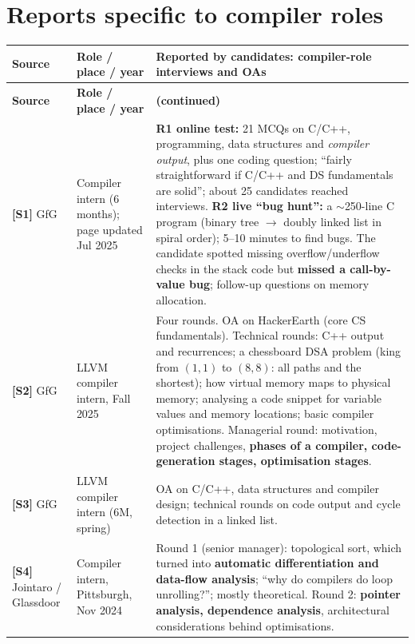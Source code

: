 \documentclass[10pt,a4paper,openany,oneside]{report}
\newcommand{\prio}[1]{\texorpdfstring{\ifcase#1\or{\color{gold}\ding{72}}\or{\color{gold}\ding{72}\ding{72}}\or{\color{gold}\ding{72}\ding{72}\ding{72}}\fi}{}}
\begin{document}
\section{Reports specific to compiler roles \prio{3}}
{\small\setlength{\tabcolsep}{3pt}
\begin{longtable}{@{}>{\raggedright\arraybackslash}p{2.1cm}>{\raggedright\arraybackslash}p{3.1cm}p{10.6cm}@{}}
\toprule
\rowcolor{orange!22}\textbf{Source} & \textbf{Role / place / year} & \textbf{Reported by candidates: compiler-role interviews and OAs}\\
\midrule
\endfirsthead
\toprule
\rowcolor{orange!22}\textbf{Source} & \textbf{Role / place / year} & \textbf{(continued)}\\
\midrule
\endhead
\textbf{[S1]} GfG & Compiler intern (6 months); page updated Jul 2025 &
 \textbf{R1 online test:} 21 MCQs on C/C++, programming, data structures and \emph{compiler output}, plus one coding question; ``fairly
 straightforward if C/C++ and DS fundamentals are solid''; about 25 candidates reached interviews.
 \textbf{R2 live ``bug hunt'':} a $\sim$250-line C program (binary tree $\to$ doubly linked list in spiral order); 5--10 minutes to find bugs. The
 candidate spotted missing overflow/underflow checks in the stack code but \textbf{missed a call-by-value bug}; follow-up questions on memory allocation.\\
\textbf{[S2]} GfG & LLVM compiler intern, Fall 2025 &
 Four rounds. OA on HackerEarth (core CS fundamentals). Technical rounds: C++ output and recurrences; a chessboard DSA problem (king from
 $(1,1)$ to $(8,8)$: all paths and the shortest); how virtual memory maps to physical memory; analysing a code snippet for variable values and
 memory locations; basic compiler optimisations. Managerial round: motivation, project challenges, \textbf{phases of a compiler, code-generation
 stages, optimisation stages}.\\
\textbf{[S3]} GfG & LLVM compiler intern (6M, spring) &
 OA on C/C++, data structures and compiler design; technical rounds on code output and cycle detection in a linked list.\\
\textbf{[S4]} Jointaro / Glassdoor & Compiler intern, Pittsburgh, Nov 2024 &
 Round 1 (senior manager): topological sort, which turned into \textbf{automatic differentiation and data-flow analysis}; ``why do compilers do
 loop unrolling?''; mostly theoretical. Round 2: \textbf{pointer analysis, dependence analysis}, architectural considerations behind optimisations.\\

\end{longtable}}
\end{document}
